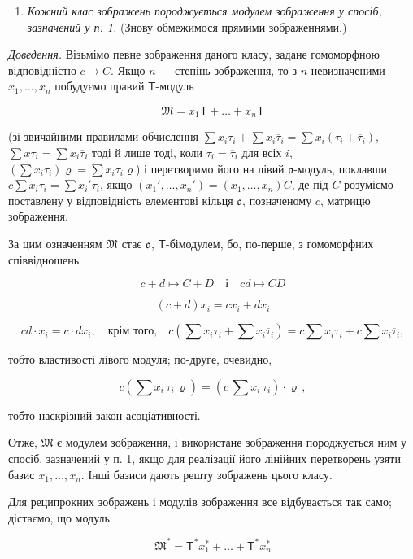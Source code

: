 \documentclass[11pt]{article}
\providecommand{\tightlist}{\setlength{\itemsep}{0pt}\setlength{\parskip}{0pt}}
\begin{document}
\begin{enumerate}
\def\labelenumi{\arabic{enumi}.}
\setcounter{enumi}{1}
\tightlist
\item
  \emph{Кожний клас зображень породжується модулем зображення у спосіб, зазначений у п. 1.} (Знову обмежимося прямими зображеннями.)
\end{enumerate}

\emph{Доведення.} Візьмімо певне зображення даного класу, задане гомоморфною відповідністю \(c\mapsto C\). Якщо \(n\) --- степінь зображення, то з \(n\) невизначеними \(x_1,\ldots,x_n\) побудуємо правий \(\mathsf T\)-модуль

\[\mathfrak{M} = x_1 \mathsf{T} + \dots + x_n \mathsf{T}\]

(зі звичайними правилами обчислення \(\sum x_i\tau_i+\sum x_i\overline{\tau}_i=\sum x_i(\tau_i+\overline{\tau}_i)\), \(\sum x\tau_i=\sum x_i\overline{\tau}_i\) тоді й лише тоді, коли \(\tau_i=\overline{\tau}_i\) для всіх \(i\), \((\sum x_i\tau_i)\varrho=\sum x_i\tau_i\varrho\)) і перетворимо його на лівий \(\mathfrak{o}\)-модуль, поклавши \(c\sum x_i\tau_i=\sum x_i'\tau_i\), якщо \((x_1',\ldots,x_n')=(x_1,\ldots,x_n)C\), де під \(C\) розуміємо поставлену у відповідність елементові кільця \(\mathfrak{o}\), позначеному \(c\), матрицю зображення.

За цим означенням \(\mathfrak M\) стає \(\mathfrak{o}\), \(\mathsf T\)-бімодулем, бо, по-перше, з гомоморфних співвідношень

\[
c+d\mapsto C+D \quad \text{і} \quad cd\mapsto CD
\]

\[
(c+d)x_i=cx_i+dx_i
\]

\[
cd\cdot x_i=c\cdot dx_i,\quad\text{крім того,}\quad
c\left(\sum x_i\tau_i+\sum x_i\overline{\tau}_i\right)
=c\sum x_i\tau_i+c\sum x_i\overline{\tau}_i,
\]

тобто властивості лівого модуля; по-друге, очевидно,

\[c(\sum x_i \, \tau_i \, \varrho) = (c \, \sum x_i \, \tau_i) \cdot \varrho \,,\]

тобто наскрізний закон асоціативності.

Отже, \(\mathfrak{M}\) є модулем зображення, і використане зображення породжується ним у спосіб, зазначений у п. 1, якщо для реалізації його лінійних перетворень узяти базис \(x_1, \ldots, x_n\). Інші базиси дають решту зображень цього класу.

Для реципрокних зображень і модулів зображення все відбувається так само; дістаємо, що модуль

\[\mathfrak{M}^* = \mathsf{T}^* x_1^* + \dots + \mathsf{T}^* x_n^*\]
\end{document}
